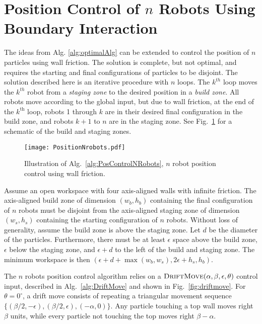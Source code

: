 

\section{Position Control of $n$ Robots Using Boundary Interaction}\label{sec:PostionControlnRobots}
The ideas from Alg. \ref{alg:optimalAlg}  can be extended to control the position of $n$ particles using wall friction.
The solution is complete, but not optimal, and requires the starting and final configurations of particles to be disjoint.
The solution described here is an iterative procedure with $n$ loops. 
 The $k^{th}$ loop moves the $k^{th}$ robot from a \emph{staging zone} to the desired position in a \emph{build zone}. 
  All robots move according to the global input, but due to wall friction, at the end of the $k^{\text{th}}$ loop, robots 1 through $k$ are in their desired final configuration in the build zone, and robots $k+1$ to $n$ are in the staging zone. 
   See Fig.~\ref{fig:simulationNrobot} for a schematic of the build and staging zones.

\begin{figure}
\begin{center}
	\texttt{[image: PositionNrobots.pdf]}
\end{center}
\vspace{-1em}
\caption{\label{fig:simulationNrobot}
Illustration of Alg.\ \ref{alg:PosControlNRobots}, $n$ robot position control  using wall friction.
}
\end{figure}

Assume an open workspace with four axis-aligned walls with infinite friction.
The axis-aligned build zone of dimension $(w_b, h_b)$ containing the final configuration of $n$ robots must be disjoint from the axis-aligned staging zone of dimension $(w_s, h_s)$  containing the starting configuration of $n$ robots.
 Without loss of generality, assume the build zone  is above the staging zone.  Let $d$ be the diameter of the particles.
Furthermore, there must be at least $\epsilon$ space above the build zone, $\epsilon$ below the staging zone, and $\epsilon + d$ to the left of the build and staging zone.  The minimum workspace is then $(\epsilon + d + \max(w_b,w_s), 2\epsilon + h_s,h_b)$.

The $n$ robots position control algorithm relies on a $\text{\sc DriftMove}(\alpha, \beta, \epsilon,\theta)$ control input, described in Alg.~\ref{alg:DriftMove} and shown in Fig.\  \ref{fig:driftmove}.
For $\theta = 0^\circ$, a drift move consists of repeating a triangular movement sequence $\{ (\beta/2,-\epsilon),(\beta/2,\epsilon),(-\alpha,0)\}$. 
 Any particle touching a top wall moves right $\beta$ units, while every particle not touching the top moves right $\beta-\alpha$.

